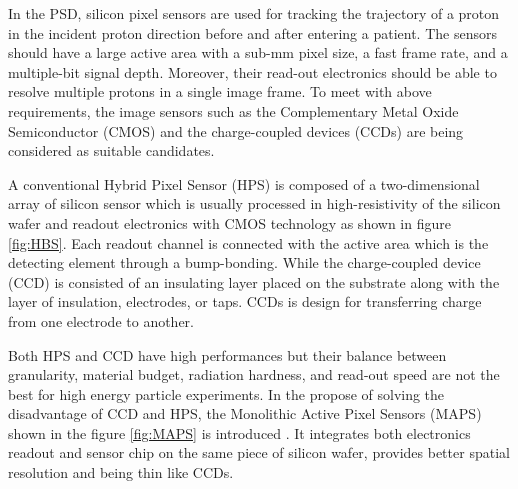 \documentclass[12pt,a4paper]{article}
\begin{document}
In the PSD, silicon pixel sensors are used for tracking the trajectory of a proton in the incident proton direction before and after entering a patient.  The sensors should have a large active area with a sub-mm pixel size, a fast frame rate, and a multiple-bit signal depth. Moreover, their read-out electronics should be able to resolve multiple protons in a single image frame.   To meet with above requirements,  the image sensors such as  the Complementary Metal Oxide Semiconductor (CMOS) \cite{CMOSinPCT} and the charge-coupled devices (CCDs) are being considered as suitable candidates. 

A conventional  Hybrid Pixel Sensor (HPS) is composed of a two-dimensional array of silicon sensor which is usually processed in high-resistivity of the silicon wafer and readout electronics with CMOS technology as shown in figure \ref{fig:HBS}. Each readout channel is connected with the active area which is the detecting element through a bump-bonding\cite{Broennimann:gf0003}.  While the charge-coupled device (CCD) is consisted of an insulating layer placed on the substrate along with the layer of insulation, electrodes, or taps. CCDs is design for transferring charge from one electrode to another.\cite{MATTIS1978355} 

Both HPS and CCD have high performances but their balance between granularity, material budget, radiation hardness, and read-out speed are not the best for high energy particle experiments.  In the propose of solving the disadvantage of CCD and HPS, the Monolithic Active Pixel Sensors (MAPS) shown in the figure \ref{fig:MAPS} is  introduced \cite{TURCHETTA2001677}. It integrates both electronics readout and sensor chip on the same piece of silicon wafer, provides better spatial resolution and being thin like CCDs.\cite{MAPS}
\end{document}
